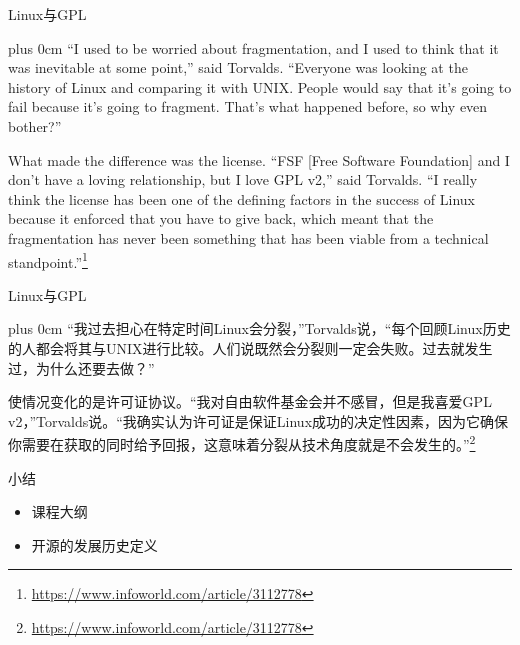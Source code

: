 \documentclass{beamer}
\renewcommand{\raggedright}{\leftskip=0pt \rightskip=0pt plus 0cm}
\begin{document}
\begin{frame}[t]{Linux与GPL}
    
    \raggedright
     ``I used to be worried about fragmentation, and I used to think that it was inevitable at some point,'' said Torvalds. ``Everyone was looking at the history of Linux and comparing it with UNIX. People would say that it's going to fail because it's going to fragment. That's what happened before, so why even bother?''

	 What made the difference was the license. ``FSF [Free Software Foundation] and I don't have a loving relationship, but I love GPL v2,'' said Torvalds. ``I really think the license has been one of the defining factors in the success of Linux because it enforced that you have to give back, which meant that the fragmentation has never been something that has been viable from a technical standpoint.''\footnote{\url{https://www.infoworld.com/article/3112778}}
\end{frame}
\begin{frame}[t]{Linux与GPL}
    
    \raggedright
     ``我过去担心在特定时间Linux会分裂，''Torvalds说，``每个回顾Linux历史的人都会将其与UNIX进行比较。人们说既然会分裂则一定会失败。过去就发生过，为什么还要去做？''

     使情况变化的是许可证协议。``我对自由软件基金会并不感冒，但是我喜爱GPL v2，''Torvalds说。``我确实认为许可证是保证Linux成功的决定性因素，因为它确保你需要在获取的同时给予回报，这意味着分裂从技术角度就是不会发生的。''\footnote{\url{https://www.infoworld.com/article/3112778}}
\end{frame}

\begin{frame}[t]{小结}
    \begin{itemize}
        \item 课程大纲
        \item 开源的发展历史定义
    \end{itemize}
\end{frame}
\end{document}
